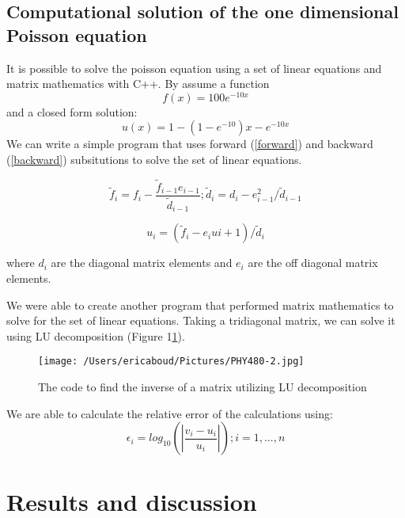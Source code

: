 \documentclass[10pt,showpacs,preprintnumbers,footinbib,amsmath,amssymb,aps,prl,twocolumn,groupedaddress,superscriptaddress,showkeys]{revtex4-1}
\begin{document}
	
	\subsection{Computational solution of the one dimensional Poisson equation}
	
	It is possible to solve the poisson equation using a set of linear equations and matrix mathematics with C++.  By assume a function \begin{equation}
	f(x)=100e^{-10x}
	\end{equation}
	and a closed form solution:
	\begin{equation}
	u(x)=1-(1-e^{-10})x-e^{-10x}
	\end{equation}
	We can write a simple program that uses forward (\ref{forward}) and backward (\ref{backward}) subsitutions to solve the set of linear equations.
	
	\begin{equation}
	\tilde{f}_{i}=f_{i}-\frac{\tilde{f}_{i-1}e_{i-1}}{\tilde{d}_{i-1}} ; \tilde{d}_{i}=d_{i}-e^{2}_{i-1}/\tilde{d}_{i-1}
	\label{forward}
	\end{equation}
	
	\begin{equation}
	u_{i} = (\tilde{f}_{i}-e_{i}u{i+1})/\tilde{d}_{i}
	\label{backward}
	\end{equation}
	
	where $d_{i}$ are the diagonal matrix elements and $e_{i}$ are the off diagonal matrix elements.
	
	We were able to create another program that performed matrix mathematics to solve for the set of linear equations.  Taking a tridiagonal matrix, we can solve it using LU decomposition (Figure 1\ref{ludecomp}).
	
	
	\begin{figure}[!ht]
			\centering
			\texttt{[image: /Users/ericaboud/Pictures/PHY480-2.jpg]}
			\label{ludecomp}
			\caption{The code to find the inverse of a matrix utilizing LU decomposition}
		\end{figure}
	
	We are able to calculate the relative error of the calculations using:
	\begin{equation}
	\epsilon_{i} = log_{10}(|\frac{v_{i}-u_{i}}{u_{i}}|)  ; i = 1,...,n
	\label{error}
	\end{equation}

	
	
	
	
	\section*{Results and discussion}
	
\end{document}
